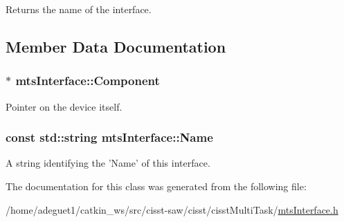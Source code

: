 Returns the name of the interface. 

\subsection{Member Data Documentation}
\hypertarget{classmts_interface_a7529d1beb91c4e4786d4c7e377bb91ae}{
\subsubsection[{Component}]{$\ast$ mts\-Interface\-::\-Component\hspace{0.3cm}{\ttfamily [protected]}}}\label{classmts_interface_a7529d1beb91c4e4786d4c7e377bb91ae}
Pointer on the device itself. \hypertarget{classmts_interface_a2c42a04708dfe68848d34bff4a5ee80b}{
\subsubsection[{Name}]{\setlength{\rightskip}{0pt plus 5cm}const std\-::string mts\-Interface\-::\-Name\hspace{0.3cm}{\ttfamily [protected]}}}\label{classmts_interface_a2c42a04708dfe68848d34bff4a5ee80b}
A string identifying the 'Name' of this interface. 

The documentation for this class was generated from the following file\-:\begin{DoxyCompactItemize}
\item 
/home/adeguet1/catkin\-\_\-ws/src/cisst-\/saw/cisst/cisst\-Multi\-Task/\hyperlink{mts_interface_8h}{mts\-Interface.\-h}\end{DoxyCompactItemize}
